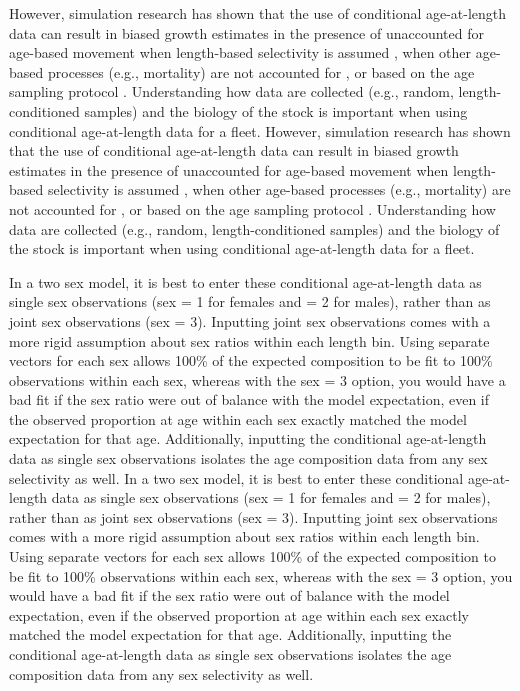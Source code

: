 However, simulation research has shown that the use of conditional age-at-length data can result in biased growth estimates in the presence of unaccounted for age-based movement when length-based selectivity is assumed \citep{lee-effects-2017}, when other age-based processes (e.g., mortality) are not accounted for \citep{lee-use-2019}, or based on the age sampling protocol \citep{piner-evaluation-2016}. Understanding how data are collected (e.g., random, length-conditioned samples) and the biology of the stock is important when using conditional age-at-length data for a fleet.   
However, simulation research has shown that the use of conditional age-at-length data can result in biased growth estimates in the presence of unaccounted for age-based movement when length-based selectivity is assumed \citep{lee-effects-2017}, when other age-based processes (e.g., mortality) are not accounted for \citep{lee-use-2019}, or based on the age sampling protocol \citep{piner-evaluation-2016}. Understanding how data are collected (e.g., random, length-conditioned samples) and the biology of the stock is important when using conditional age-at-length data for a fleet.   

In a two sex model, it is best to enter these conditional age-at-length data as single sex observations (sex = 1 for females and = 2 for males), rather than as joint sex observations (sex = 3). Inputting joint sex observations comes with a more rigid assumption about sex ratios within each length bin. Using separate vectors for each sex allows 100\% of the expected composition to be fit to 100\% observations within each sex, whereas with the sex = 3 option, you would have a bad fit if the sex ratio were out of balance with the model expectation, even if the observed proportion at age within each sex exactly matched the model expectation for that age. Additionally, inputting the conditional age-at-length data as single sex observations isolates the age composition data from any sex selectivity as well.
In a two sex model, it is best to enter these conditional age-at-length data as single sex observations (sex = 1 for females and = 2 for males), rather than as joint sex observations (sex = 3). Inputting joint sex observations comes with a more rigid assumption about sex ratios within each length bin. Using separate vectors for each sex allows 100\% of the expected composition to be fit to 100\% observations within each sex, whereas with the sex = 3 option, you would have a bad fit if the sex ratio were out of balance with the model expectation, even if the observed proportion at age within each sex exactly matched the model expectation for that age. Additionally, inputting the conditional age-at-length data as single sex observations isolates the age composition data from any sex selectivity as well.

